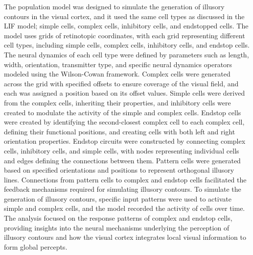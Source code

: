 \documentclass[12pt]{article}
\begin{document}
The population model was designed to simulate the generation of illusory contours in the visual cortex, and it used the same cell types as discussed in the LIF model; simple cells, complex cells, inhibitory cells, and endstopped cells. The model uses grids of retinotopic coordinates, with each grid representing different cell types, including simple cells, complex cells, inhibitory cells, and endstop cells. The neural dynamics of each cell type were defined by parameters such as length, width, orientation, transmitter type, and specific neural dynamics operators modeled using the Wilson-Cowan framework. Complex cells were generated across the grid with specified offsets to ensure coverage of the visual field, and each was assigned a position based on its offset values. Simple cells were derived from the complex cells, inheriting their properties, and inhibitory cells were created to modulate the activity of the simple and complex cells. Endstop cells were created by identifying the second-closest complex cell to each complex cell, defining their functional positions, and creating cells with both left and right orientation properties. Endstop circuits were constructed by connecting complex cells, inhibitory cells, and simple cells, with nodes representing individual cells and edges defining the connections between them. Pattern cells were generated based on specified orientations and positions to represent orthogonal illusory lines. Connections from pattern cells to complex and endstop cells facilitated the feedback mechanisms required for simulating illusory contours. To simulate the generation of illusory contours, specific input patterns were used to activate simple and complex cells, and the model recorded the activity of cells over time. The analysis focused on the response patterns of complex and endstop cells, providing insights into the neural mechanisms underlying the perception of illusory contours and how the visual cortex integrates local visual information to form global percepts. 
\end{document}
